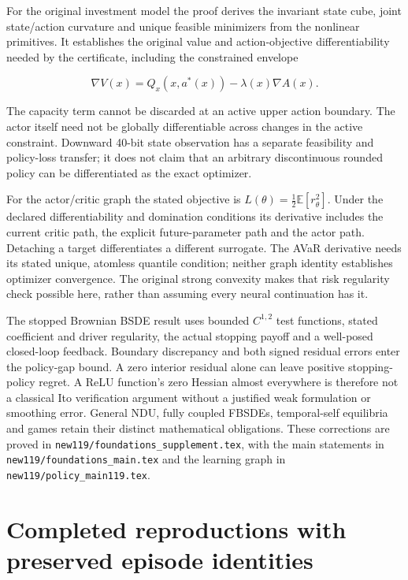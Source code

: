 For the original investment model the proof derives the invariant state cube, joint state/action curvature and unique feasible minimizers from the nonlinear primitives. It establishes the original value and action-objective differentiability needed by the certificate, including the constrained envelope

\[
\nabla V(x)=Q_x(x,a^*(x))-\lambda(x)\nabla A(x).
\]

The capacity term cannot be discarded at an active upper action boundary. The actor itself need not be globally differentiable across changes in the active constraint. Downward 40-bit state observation has a separate feasibility and policy-loss transfer; it does not claim that an arbitrary discontinuous rounded policy can be differentiated as the exact optimizer.

For the actor/critic graph the stated objective is \(L(\theta)=\tfrac12\mathbb E[r_\theta^2]\). Under the declared differentiability and domination conditions its derivative includes the current critic path, the explicit future-parameter path and the actor path. Detaching a target differentiates a different surrogate. The AVaR derivative needs its stated unique, atomless quantile condition; neither graph identity establishes optimizer convergence. The original strong convexity makes that risk regularity check possible here, rather than assuming every neural continuation has it.

The stopped Brownian BSDE result uses bounded \(C^{1,2}\) test functions, stated coefficient and driver regularity, the actual stopping payoff and a well-posed closed-loop feedback. Boundary discrepancy and both signed residual errors enter the policy-gap bound. A zero interior residual alone can leave positive stopping-policy regret. A ReLU function's zero Hessian almost everywhere is therefore not a classical Ito verification argument without a justified weak formulation or smoothing error. General NDU, fully coupled FBSDEs, temporal-self equilibria and games retain their distinct mathematical obligations. These corrections are proved in \nolinkurl{new119/foundations_supplement.tex}, with the main statements in \nolinkurl{new119/foundations_main.tex} and the learning graph in \nolinkurl{new119/policy_main119.tex}.

\hypertarget{completed-reproductions-with-preserved-episode-identities}{%
\section{Completed reproductions with preserved episode identities}\label{completed-reproductions-with-preserved-episode-identities}}

